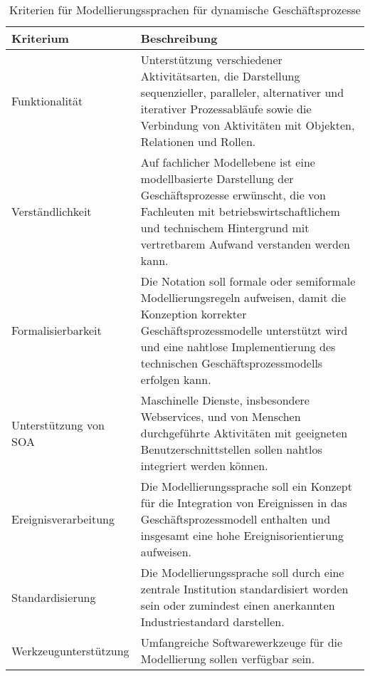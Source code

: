 \begin{table}[H]
	\centering
	\begin{tabularx}{\textwidth}{l X} 
		\toprule
		\textbf{Kriterium}  &   
		\textbf{Beschreibung}  \\ 
		\toprule
		Funktionalität &   
		Unterstützung verschiedener Aktivitätsarten, die Darstellung sequenzieller, paralleler, alternativer und iterativer Prozessabläufe sowie die Verbindung von Aktivitäten mit Objekten, Relationen und Rollen.   \\  \cmidrule(r){1-1} \cmidrule(r){2-2}
		
		Verständlichkeit &   
		Auf fachlicher Modellebene ist eine modellbasierte Darstellung der Geschäftsprozesse erwünscht, die von Fachleuten mit betriebswirtschaftlichem und technischem Hintergrund mit vertretbarem Aufwand verstanden werden kann. \\ \cmidrule(r){1-1} \cmidrule(r){2-2}
		
		Formalisierbarkeit &   
		Die Notation soll formale oder semiformale Modellierungsregeln aufweisen, damit die Konzeption korrekter Geschäftsprozessmodelle unterstützt wird und eine nahtlose Implementierung des technischen Geschäftsprozessmodells erfolgen kann.  \\ \cmidrule(r){1-1} \cmidrule(r){2-2}
		
		Unterstützung von \ac{SOA} &   
		Maschinelle Dienste, insbesondere Webservices, und von Menschen durchgeführte Aktivitäten mit geeigneten Benutzerschnittstellen sollen nahtlos integriert werden können.  \\ \cmidrule(r){1-1} \cmidrule(r){2-2}
		
		Ereignisverarbeitung &   
		Die Modellierungssprache soll ein Konzept für die Integration von Ereignissen in das Geschäftsprozessmodell enthalten und insgesamt eine hohe Ereignisorientierung aufweisen.   \\ \cmidrule(r){1-1} \cmidrule(r){2-2}
		
		Standardisierung &   
		Die Modellierungssprache soll durch eine zentrale Institution standardisiert worden sein oder zumindest einen anerkannten Industriestandard darstellen. \\ \cmidrule(r){1-1} \cmidrule(r){2-2}
		
		Werkzeugunterstützung &   
		Umfangreiche Softwarewerkzeuge für die Modellierung sollen verfügbar sein.  \\
	    \bottomrule
	\end{tabularx}
	\caption[Kriterien für Modellierungssprachen]
    {Kriterien für Modellierungssprachen für dynamische Geschäftsprozesse}
    \label{tab:Kriterien für Modellierungssprachen}
\end{table}

